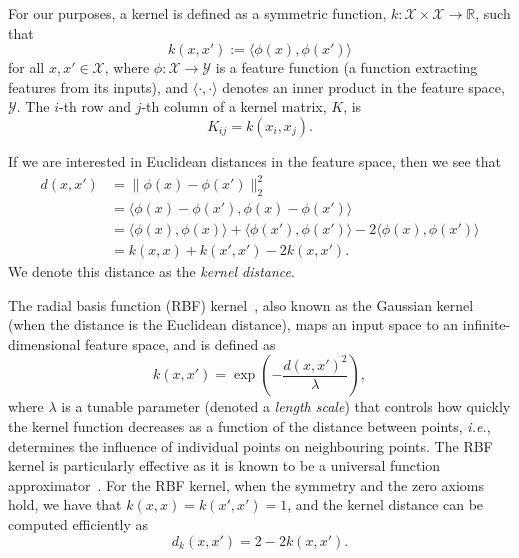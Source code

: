 \documentclass[preprint,12pt]{article}
\begin{document}
For our purposes, a kernel is defined as a symmetric function, $k : \mathcal{X} \times \mathcal{X} \rightarrow \mathbb{R}$, such that
\begin{equation}
    k(x, x') := \langle \phi(x), \phi(x') \rangle 
    \label{eq:kernel}
\end{equation}
for all $x, x' \in \mathcal{X}$,
where $\phi: \mathcal{X} \to \mathcal{Y}$ is a feature function (a function extracting features from its inputs), and $\langle \cdot, \cdot \rangle$ denotes an inner product in the feature space, $\mathcal{Y}$.
The $i$-th row and $j$-th column of a kernel matrix, $K$, is
$$
    K_{ij} = k(x_i, x_j).
$$


If we are interested in Euclidean distances in the feature space, then we see that
\begin{align*}
    d(x,x')
        &= \| \phi(x) - \phi(x') \|_2^2 \\ 
        &= \langle\phi(x) - \phi(x'), \phi(x) - \phi(x') \rangle \\
        &= \langle \phi(x), \phi(x) \rangle + \langle \phi(x'), \phi(x') \rangle - 2\langle \phi(x), \phi(x') \rangle \\
        &= k(x, x) + k(x', x') - 2k(x, x').
\end{align*}
We denote this distance as the \textit{kernel distance}.

\label{rbf_kernel}

The radial basis function (RBF) kernel~\cite{kernels}, also known as the Gaussian kernel (when the distance is the Euclidean distance), maps an input space to an infinite-dimensional feature space, and is defined as
$$
    k(x, x') = \exp\left(-\frac{d(x, x')^2}{\lambda}\right),
$$
where $\lambda$ is a tunable parameter (denoted a \textit{length scale}) that controls how quickly the kernel function decreases as a function of the distance between points, \textit{i.e.}, determines the influence of individual points on neighbouring points.
The RBF kernel is particularly effective as it is known to be a universal function approximator~\cite{}.
For the RBF kernel, when the symmetry and the zero axioms hold, we have that $k(x,x) = k(x',x') = 1$, and the kernel distance can be computed efficiently as
$$
    d_k(x, x') = 2 - 2 k(x, x').
$$
\end{document}
